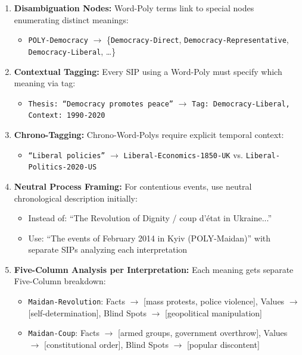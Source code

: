 \documentclass[11pt,a4paper]{article}
\theoremstyle{definition}
\theoremstyle{remark}
\newcommand{\SIP}{\textsc{SIP}}
\begin{document}
\begin{mdframed}[style=implementationbox, frametitle={Disambiguation Protocol}]
\begin{enumerate}
    \item \textbf{Disambiguation Nodes:} Word-Poly terms link to special nodes enumerating distinct meanings:
    \begin{itemize}
        \item \texttt{POLY-Democracy} $\to$ \{\texttt{Democracy-Direct}, \texttt{Democracy-Representative}, \texttt{Democracy-Liberal}, \ldots\}
    \end{itemize}
    
    \item \textbf{Contextual Tagging:} Every \SIP{} using a Word-Poly must specify which meaning via tag:
    \begin{itemize}
        \item \texttt{Thesis: ``Democracy promotes peace''} $\to$ \texttt{Tag: Democracy-Liberal, Context: 1990-2020}
    \end{itemize}
    
    \item \textbf{Chrono-Tagging:} Chrono-Word-Polys require explicit temporal context:
    \begin{itemize}
        \item \texttt{``Liberal policies''} $\to$ \texttt{Liberal-Economics-1850-UK} vs. \texttt{Liberal-Politics-2020-US}
    \end{itemize}
    
    \item \textbf{Neutral Process Framing:} For contentious events, use neutral chronological description initially:
    \begin{itemize}
        \item Instead of: ``The Revolution of Dignity / coup d'état in Ukraine...''
        \item Use: ``The events of February 2014 in Kyiv (POLY-Maidan)'' with separate \SIP{}s analyzing each interpretation
    \end{itemize}
    
    \item \textbf{Five-Column Analysis per Interpretation:} Each meaning gets separate Five-Column breakdown:
    \begin{itemize}
        \item \texttt{Maidan-Revolution}: Facts $\to$ [mass protests, police violence], Values $\to$ [self-determination], Blind Spots $\to$ [geopolitical manipulation]
        \item \texttt{Maidan-Coup}: Facts $\to$ [armed groups, government overthrow], Values $\to$ [constitutional order], Blind Spots $\to$ [popular discontent]
    \end{itemize}
\end{enumerate}
\end{mdframed}
\end{document}
